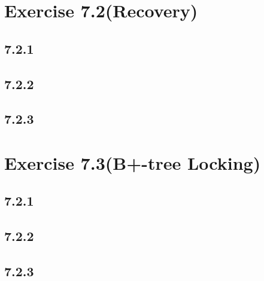 \documentclass[12pt]{article}
\begin{document}
	\section*{Exercise 7.2(Recovery)}
	\subsection*{7.2.1}
		
	\subsection*{7.2.2}
	
	\subsection*{7.2.3}
		
		
		
	\section*{Exercise 7.3(B+-tree Locking)}
	\subsection*{7.2.1}
		
	\subsection*{7.2.2}
	
	\subsection*{7.2.3}
	
\end{document}
